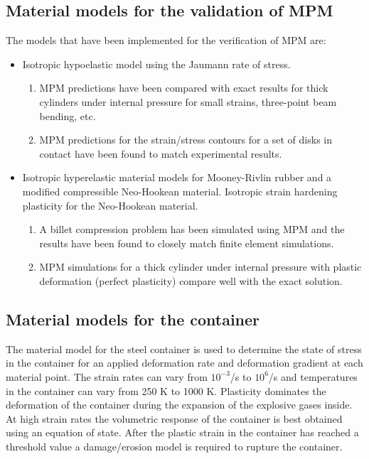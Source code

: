 \subsection{Material models for the validation of MPM}
The models that have been implemented for the verification of MPM
are:
\begin{itemize}
   \item Isotropic hypoelastic model using the Jaumann rate of 
         stress.
     \begin{enumerate}
        \item  MPM predictions have been compared with exact results 
               for thick cylinders under internal pressure for small
               strains, three-point beam bending, etc.
        \item  MPM predictions for the strain/stress contours for
               a set of disks in contact have been found to match
               experimental results.
     \end{enumerate}
   \item Isotropic hyperelastic material models for Mooney-Rivlin
         rubber and a modified compressible Neo-Hookean material. 
         Isotropic strain hardening plasticity for the Neo-Hookean
         material.
     \begin{enumerate}
        \item  A billet compression problem has been simulated using
               MPM and the results have been found to closely 
               match finite element simulations.
        \item  MPM simulations for a thick cylinder under internal
               pressure with plastic deformation (perfect plasticity)
               compare well with the exact solution.
     \end{enumerate}
\end{itemize}

\subsection{Material models for the container}
The material model for the steel container is used to determine
the state of stress in the container for an applied deformation
rate and deformation gradient at each material point.  The strain 
rates can vary from $10^{-3}$/s to $10^6$/s and temperatures in 
the container can vary from 250 K to 1000 K.  Plasticity dominates
the deformation of the container during the expansion of the 
explosive gases inside.  At high strain rates the volumetric
response of the container is best obtained using an equation of 
state.  After the plastic strain in the container
has reached a threshold value a damage/erosion model is required to
rupture the container.

